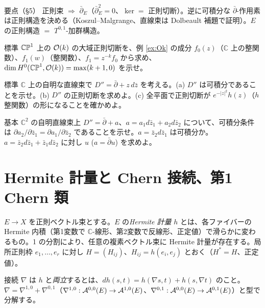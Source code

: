 \begin{keybox}{要点（§5）}
正則束 $\Rightarrow$ $\bar\partial_E$（$\bar\partial_E^2=0$、$\ker=$ 正則切断）。逆に可積分な $\bar\partial$-作用素は正則構造を決める（Koszul--Malgrange、直線束は Dolbeault 補題で証明）。$E$ の正則構造 $=$ $T^{0,1}$-加群構造。
\end{keybox}

\begin{prob}{標準}\label{p:Ok}
$\mathbb{CP}^1$ 上の $\mathcal O(k)$ の大域正則切断を、例 \ref{ex:Ok} の成分 $f_0(z)$（$\mathbb C$ 上の整関数）、$f_1(w)$（整関数）、$f_1=z^{-k}f_0$ から求め、$\dim H^0(\mathbb{CP}^1,\mathcal O(k))=\max(k+1,0)$ を示せ。
\end{prob}
\begin{prob}{標準}\label{p:gauge}
$\mathbb C$ 上の自明な直線束で $D''=\bar\partial+z\,d\bar z$ を考える。(a) $D''$ は可積分であることを示せ。(b) $D''$ の正則切断を求めよ。(c) 全平面で正則切断が $e^{-|z|^2}h(z)$（$h$ 整関数）の形になることを確かめよ。
\end{prob}
\begin{prob}{基本}\label{p:integr}
$\mathbb C^2$ の自明直線束上 $D''=\bar\partial+a$、$a=a_1d\bar z_1+a_2d\bar z_2$ について、可積分条件は $\partial a_2/\partial\bar z_1=\partial a_1/\partial\bar z_2$ であることを示せ。$a=\bar z_2d\bar z_1$ は可積分か。$a=\bar z_2d\bar z_1+\bar z_1d\bar z_2$ に対し $u$ ($a=\bar\partial u$) を求めよ。
\end{prob}
\section{Hermite 計量と Chern 接続、第1 Chern 類}\label{sec:chern}

$E\to X$ を正則ベクトル束とする。$E$ の\emph{Hermite 計量} $h$ とは、各ファイバーの Hermite 内積（第1変数で $\mathbb C$-線形、第2変数で反線形、正定値）で滑らかに変わるもの。1 の分割により、任意の複素ベクトル束に Hermite 計量が存在する。局所正則枠 $e_1,\dots,e_r$ に対し $H=(H_{ij})$、$H_{ij}=h(e_i,e_j)$ とおく（$H^*=H$、正定値）。

接続 $\nabla$ は $h$ と\emph{両立}するとは、$dh(s,t)=h(\nabla s,t)+h(s,\nabla t)$ のこと。$\nabla=\nabla^{1,0}+\nabla^{0,1}$（$\nabla^{1,0}:\mathcal A^{0,0}(E)\to\mathcal A^{1,0}(E)$、$\nabla^{0,1}:\mathcal A^{0,0}(E)\to\mathcal A^{0,1}(E)$）と型で分解する。

